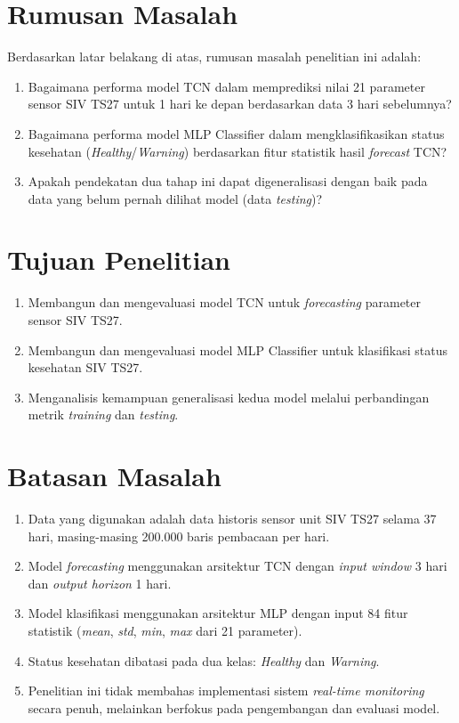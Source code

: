 \documentclass[12pt,a4paper]{report}
\begin{document}
\section{Rumusan Masalah}
Berdasarkan latar belakang di atas, rumusan masalah penelitian ini adalah:
\begin{enumerate}
    \item Bagaimana performa model TCN dalam memprediksi nilai 21 parameter sensor SIV TS27 untuk 1 hari ke depan berdasarkan data 3 hari sebelumnya?
    \item Bagaimana performa model MLP Classifier dalam mengklasifikasikan status kesehatan (\textit{Healthy}/\textit{Warning}) berdasarkan fitur statistik hasil \textit{forecast} TCN?
    \item Apakah pendekatan dua tahap ini dapat digeneralisasi dengan baik pada data yang belum pernah dilihat model (data \textit{testing})?
\end{enumerate}

\section{Tujuan Penelitian}
\begin{enumerate}
    \item Membangun dan mengevaluasi model TCN untuk \textit{forecasting} parameter sensor SIV TS27.
    \item Membangun dan mengevaluasi model MLP Classifier untuk klasifikasi status kesehatan SIV TS27.
    \item Menganalisis kemampuan generalisasi kedua model melalui perbandingan metrik \textit{training} dan \textit{testing}.
\end{enumerate}

\section{Batasan Masalah}
\begin{enumerate}
    \item Data yang digunakan adalah data historis sensor unit SIV TS27 selama 37 hari, masing-masing 200.000 baris pembacaan per hari.
    \item Model \textit{forecasting} menggunakan arsitektur TCN dengan \textit{input window} 3 hari dan \textit{output horizon} 1 hari.
    \item Model klasifikasi menggunakan arsitektur MLP dengan input 84 fitur statistik (\textit{mean}, \textit{std}, \textit{min}, \textit{max} dari 21 parameter).
    \item Status kesehatan dibatasi pada dua kelas: \textit{Healthy} dan \textit{Warning}.
    \item Penelitian ini tidak membahas implementasi sistem \textit{real-time monitoring} secara penuh, melainkan berfokus pada pengembangan dan evaluasi model.
\end{enumerate}
\end{document}
